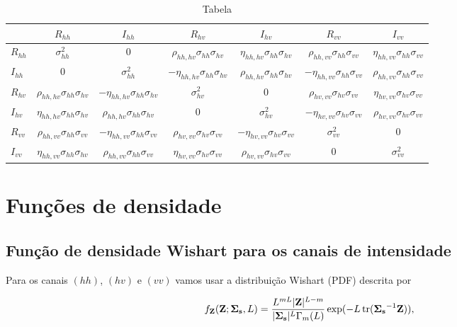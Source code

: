 \begin{sidewaystable}
	\centering
	\caption{Tabela}
\begin{tabular}{@{}lcccccc@{}} \toprule
	     &$R_{hh}$        & $I_{hh}$ & $R_{hv}$&$I_{hv}$                            &$R_{vv}$                           &$I_{vv}$ \\ \midrule
$R_{hh}$ &$\sigma_{hh}^2$ & 0                  &$\rho_{hh,hv}\sigma_{hh}\sigma_{hv}$ &$\eta_{hh,hv}\sigma_{hh}\sigma_{hv}$ & $\rho_{hh,vv}\sigma_{hh}\sigma_{vv}$&$\eta_{hh,vv}\sigma_{hh}\sigma_{vv}$  \\ 
	$I_{hh}$ & 0 & $\sigma_{hh}^2$ &$-\eta_{hh,hv}\sigma_{hh}\sigma_{hv}$ &$\rho_{hh,hv}\sigma_{hh}\sigma_{hv}$ &$-\eta_{hh,vv}\sigma_{hh}\sigma_{vv}$ &$\rho_{hh,vv}\sigma_{hh}\sigma_{vv}$  \\ 
	$R_{hv}$ &$\rho_{hh,hv}\sigma_{hh}\sigma_{hv}$   &$-\eta_{hh,hv}\sigma_{hh}\sigma_{hv}$  &$\sigma_{hv}^2$ &0 &$\rho_{hv,vv}\sigma_{hv}\sigma_{vv}$ &$\eta_{hv,vv}\sigma_{hv}\sigma_{vv}$  \\ 
	$I_{hv}$ &$\eta_{hh,hv}\sigma_{hh}\sigma_{hv}$  &$\rho_{hh,hv}\sigma_{hh}\sigma_{hv}$  &0 &$\sigma_{hv}^2$ &$-\eta_{hv,vv}\sigma_{hv}\sigma_{vv}$ &$\rho_{hv,vv}\sigma_{hv}\sigma_{vv}$ \\ 
	$R_{vv}$ &$\rho_{hh,vv}\sigma_{hh}\sigma_{vv}$  &$-\eta_{hh,vv}\sigma_{hh}\sigma_{vv}$  &$\rho_{hv,vv}\sigma_{hv}\sigma_{vv}$ &$-\eta_{hv,vv}\sigma_{hv}\sigma_{vv}$ & $\sigma_{vv}^2$ &0 \\ 
    $I_{vv}$ &$\eta_{hh,vv}\sigma_{hh}\sigma_{hv}$  &$\rho_{hh,vv}\sigma_{hh}\sigma_{vv}$  &$\eta_{hv,vv}\sigma_{hv}\sigma_{vv}$ &$\rho_{hv,vv}\sigma_{hv}\sigma_{vv}$ & 0 &$\sigma_{vv}^2$ \\ 	 \bottomrule
\end{tabular}
\end{sidewaystable}
\section{Funções de densidade}
\subsection{Função de densidade Wishart para os canais de intensidade}
Para os canais $(hh)$, $(hv)$ e $(vv)$ vamos usar a distribuição Wishart (PDF) descrita por

\begin{equation}
    f_{\mathbf{Z}}(\mathbf{Z};\mathbf{\Sigma_{s}},L)=\frac{L^{mL}|\mathbf{Z}|^{L-m}}{|\mathbf{\Sigma_{s}}|^{L}\Gamma_m(L)} \exp(-L\operatorname{tr}(\mathbf{\Sigma_{s}}^{-1}\mathbf{Z})), \\
\end{equation} 

